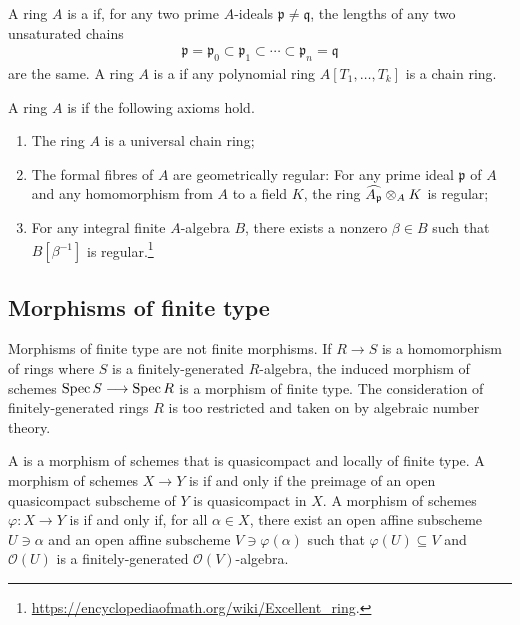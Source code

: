 \documentclass [11 pt, oneside] {article}
\begin{document}
\begin{definition}[ ]\label{}\text{}
A ring $A$ is a  if, for any two prime $A$-ideals $\mathfrak{p}\ne \mathfrak{q}$, the lengths of any two unsaturated chains 
\begin{align*}
	\mathfrak{p} = \mathfrak{p}_0 \subset \mathfrak{p}_1\subset\cdots\subset \mathfrak{p}_n=\mathfrak{q}
\end{align*}
are the same. A ring $A$ is a  if any polynomial ring $A[T_1,\hdots, T_k]$ is a chain ring.
\end{definition}


\begin{definition}[ ]\label{}\text{}
A ring $A$ is  if the following axioms hold.
\begin{enumerate}
	\item The ring $A$ is a universal chain ring;
	\item The formal fibres of $A$ are geometrically regular: For any prime ideal $\mathfrak{p}$ of $A$ and any homomorphism from $A$ to a field $K$, the ring $\widehat{A_{\mathfrak{p}}}\otimes_A K$ is regular;
	\item For any integral finite $A$-algebra $B$, there exists a nonzero $\beta\in B$ such that $B[\beta^{-1}]$ is regular.\footnote{\url{https://encyclopediaofmath.org/wiki/Excellent_ring}.}
\end{enumerate}
\end{definition}

\subsection{Morphisms of finite type}
Morphisms of finite type are not finite morphisms. If $R\longrightarrow S$ is a homomorphism of rings where $S$ is a finitely-generated $R$-algebra, the induced morphism of schemes $\operatorname{Spec} S \longrightarrow \operatorname{Spec} R$ is a morphism of finite type. The consideration of finitely-generated rings $R$ is too restricted and taken on by algebraic number theory.

A  is a morphism of schemes that is quasicompact and locally of finite type. A morphism of schemes $X\longrightarrow Y$ is  if and only if the preimage of an open quasicompact subscheme of $Y$ is quasicompact in $X$. A morphism of schemes $\varphi: X\longrightarrow Y$ is  if and only if, for all $\alpha\in X$, there exist an open affine subscheme $U\ni \alpha$ and an open affine subscheme $V \ni \varphi(\alpha)$ such that $\varphi(U)\subseteq V$ and $\mathscr{O}(U)$ is a finitely-generated $\mathscr{O}(V)$-algebra.
\end{document}
